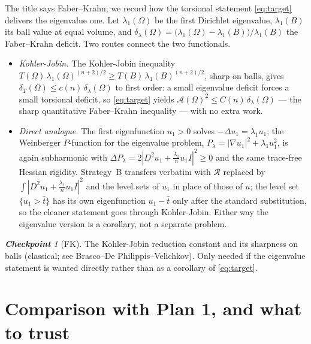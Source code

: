 \documentclass[11pt]{amsart}
\theoremstyle{definition}
\theoremstyle{remark}
\newtheorem*{checkpoint}{\textbf{Checkpoint}}
\newcommand{\Om}{\Omega}
\newcommand{\dT}{\delta_T}
\newcommand{\Asym}{\mathcal A}
\newcommand{\R}{\mathcal R}
\begin{document}
The title says Faber--Krahn; we record how the torsional statement
\eqref{eq:target} delivers the eigenvalue one. Let $\lambda_1(\Om)$ be the
first Dirichlet eigenvalue, $\lambda_1(B)$ its ball value at equal volume, and
$\delta_\lambda(\Om)=\bigl(\lambda_1(\Om)-\lambda_1(B)\bigr)/\lambda_1(B)$ the
Faber--Krahn deficit. Two routes connect the two functionals.
\begin{itemize}
\item \emph{Kohler-Jobin.} The Kohler-Jobin inequality
$T(\Om)\,\lambda_1(\Om)^{(n+2)/2}\ge T(B)\,\lambda_1(B)^{(n+2)/2}$, sharp on
balls, gives $\dT(\Om)\le c(n)\,\delta_\lambda(\Om)$ to first order: a small
eigenvalue deficit forces a small torsional deficit, so \eqref{eq:target}
yields $\Asym(\Om)^2\le C(n)\,\delta_\lambda(\Om)$ --- the sharp quantitative
Faber--Krahn inequality --- with no extra work.
\item \emph{Direct analogue.} The first eigenfunction $u_1>0$ solves
$-\Delta u_1=\lambda_1 u_1$; the Weinberger $P$-function for the eigenvalue
problem, $P_\lambda=|\nabla u_1|^2+\lambda_1 u_1^2$, is again subharmonic with
$\Delta P_\lambda=2|D^2u_1+\tfrac{\lambda_1}{n}u_1 I|^2\ge0$ and the same
trace-free Hessian rigidity. Strategy~B transfers verbatim with $\R$ replaced
by $\int|D^2u_1+\tfrac{\lambda_1}{n}u_1I|^2$ and the level sets of $u_1$ in
place of those of $u$; the level set $\{u_1>\hat t\}$ has its own eigenfunction
$u_1-\hat t$ only after the standard substitution, so the cleaner statement
goes through Kohler-Jobin. Either way the eigenvalue version is a corollary,
not a separate problem.
\end{itemize}
\begin{checkpoint}[FK]
The Kohler-Jobin reduction constant and its sharpness on balls (classical;
see Brasco--De Philippis--Velichkov). Only needed if the eigenvalue
statement is wanted directly rather than as a corollary of \eqref{eq:target}.
\end{checkpoint}

\section{Comparison with Plan 1, and what to trust}
\end{document}
